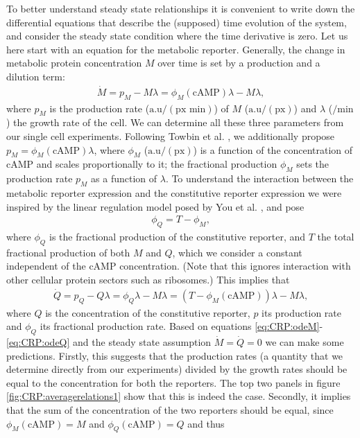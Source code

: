 To better understand steady state relationships it is convenient to write down the differential equations that describe the (supposed) time evolution of the system, 
and consider the steady state condition where the time derivative is zero.
%
Let us here start with an equation for the metabolic reporter.
%
Generally, the change in metabolic protein concentration $M$ over time is set by a production and a dilution term:
\begin{align}
	\label{eq:CRP:odeM}
	\dot{M} = p_M - M \lambda = \phi_M(\text{cAMP}) \lambda -  M \lambda
	,
\end{align}
% 
where $p_M$ is the production rate ($\text{a.u}/(\text{px min})$) of $M$ ($\text{a.u}/(\text{px})$) and $\lambda$ ($/\text{min}$) the growth rate of the cell.
We can determine all these three parameters from our single cell experiments.
Following Towbin et al. \cite{Towbin2017}, we additionally propose $p_M = \phi_M(\text{cAMP}) \lambda$, where $\phi_M$ ($\text{a.u}/(\text{px})$) is a function of the concentration of cAMP and scales proportionally to it; the fractional production $\phi_M$ sets the production rate $p_M$ as a function of $\lambda$.
%
To understand the interaction between the metabolic reporter expression and the constitutive reporter expression we were inspired by the linear regulation model posed by You et al. \cite{You2013}, and pose
\begin{align}
	\label{eq:CRP:relationMQ}
	\phi_Q = T - \phi_M
	,
\end{align}
where $\phi_Q$ is the fractional production of the constitutive reporter, and $T$ the total fractional production of both $M$ and $Q$, which we consider a constant independent of the cAMP concentration. 
(Note that this ignores interaction with other cellular protein sectors such as ribosomes.) 
%
This implies that
\begin{align}
	\label{eq:CRP:odeQ}
	\dot{Q} = p_Q - Q \lambda = \phi_Q \lambda -  M \lambda = (T - \phi_M(\text{cAMP})) \lambda -  M \lambda
	,
\end{align}
where $Q$ is the concentration of the constitutive reporter, $p$ its production rate and $\phi_Q$ its fractional production rate.
%
Based on equations \ref{eq:CRP:odeM}-\ref{eq:CRP:odeQ} and the steady state assumption $\dot{M}=\dot{Q}=0$ we can make some predictions. Firstly, this suggests that the production rates (a quantity that we determine directly from our experiments) divided by the growth rates should be equal to the concentration for both the reporters. The top two panels in figure \ref{fig:CRP:averagerelations1} show that this is indeed the case. Secondly, it implies that the sum of the concentration of the two reporters should be equal, since $\phi_M(\text{cAMP}) = M$ and $\phi_Q(\text{cAMP}) = Q$ and thus 
